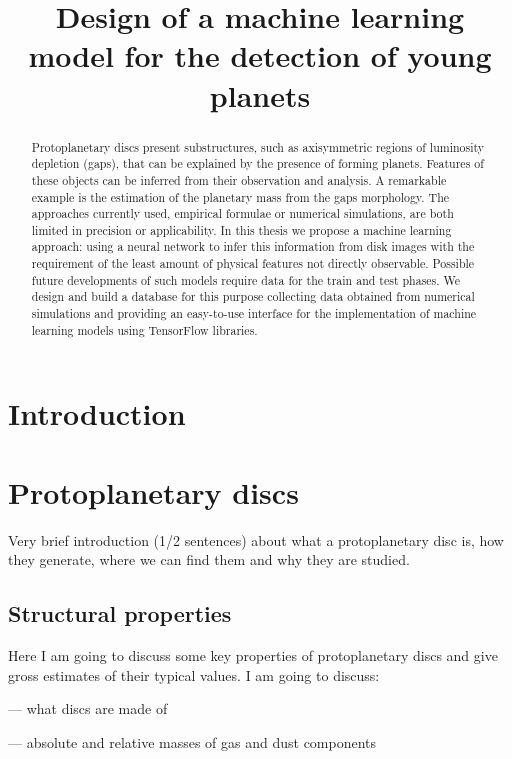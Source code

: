\documentclass[a4paper,10pt]{report}
\title{Design of a machine learning model for the detection of young planets}
\author{}
\begin{document}
\maketitle

\begin{abstract}
    Protoplanetary discs present substructures,
    such as axisymmetric regions of luminosity depletion (gaps),
    that can be explained by the presence of forming planets. 
    Features of these objects can be inferred from their
    observation and analysis. A remarkable example is the 
    estimation of the planetary mass from the gaps morphology.
    The approaches currently used, empirical formulae or numerical
    simulations, are both limited in precision or applicability.
    In this thesis we propose a machine learning approach:
    using a neural network to infer this information from 
    disk images with the requirement of the least amount
    of physical features not directly observable.
    Possible future developments of such models require 
    data for the train and test phases.
    We design and build a database for this purpose collecting 
    data obtained from numerical simulations and providing an 
    easy-to-use interface for the implementation of machine learning
    models using TensorFlow libraries.
\end{abstract}

\tableofcontents

\chapter{Introduction}


\chapter{Protoplanetary discs}
Very brief introduction (1/2 sentences) about what a protoplanetary disc is,
how they generate, where we can find them and why they are studied.

\section{Structural properties}
Here I am going to discuss some key properties of protoplanetary discs and give
gross estimates of their typical values. I am going to discuss: 

— what discs are made of

— absolute and relative masses of gas and dust components
\end{document}

